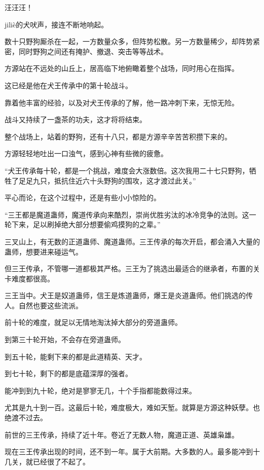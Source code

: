 
\begin{this_body}

汪汪汪！

jiliè的犬吠声，接连不断地响起。

数十只野狗厮杀在一起，一方数量众多，但阵势松散。另一方数量稀少，却阵势紧密，同时野狗之间还有掩护、撤退、突击等等战术。

方源站在不远处的山丘上，居高临下地俯瞰着整个战场，同时用心在指挥。

这已经是他在犬王传承中的第十轮战斗。

靠着他丰富的经验，以及对犬王传承的了解，他一路冲刺下来，无惊无险。

战斗又持续了一盏茶的功夫，这才将将结束。

整个战场上，站着的野狗，还有十八只，都是方源辛辛苦苦积攒下来的。

方源轻轻地吐出一口浊气，感到心神有些微的疲惫。

“犬王传承每十轮，都是一个挑战，难度会大涨数倍。这次我用二十七只野狗，牺牲了足足九只，抵抗住近六十头野狗的围攻，这才渡过此关。”

平心而论，在这个过程中，还是有些小小惊险的。

“三王都是魔道蛊师，魔道传承向来酷烈，崇尚优胜劣汰的冰冷竞争的法则。这一轮下来，足以刷掉绝大部分想要偷鸡摸狗的之辈。”

三叉山上，有无数的正道蛊师、魔道蛊师。三王传承的每次开启，都会涌入大量的蛊师，想要进来碰运气。

但三王传承，不管哪一道都极其严格。三王为了挑选出最适合的继承者，布置的关卡难度都很高。

三王当中。犬王是奴道蛊师，信王是炼道蛊师，爆王是炎道蛊师。他们挑选的传人。自然也要这些流派。

前十轮的难度，就足以无情地淘汰掉大部分的旁道蛊师。

到第三十轮开始，不会存在旁道蛊师。

到五十轮，能剩下来的都是此道精英、天才。

到七十轮，剩下的都是底蕴深厚的强者。

能冲到到九十轮，绝对是寥寥无几，十个手指都能数得过来。

尤其是九十到一百。这最后十轮，难度极大，难如天堑。就算是方源这种妖孽。也绝渡不过去。

前世的三王传承，持续了近十年。卷近了无数人物，魔道正道、英雄枭雄。

现在三王传承出现的时间，还不到一年。属于大前期。大多数的人。最多能冲到十几关，就已经很了不起了。


\end{this_body}
